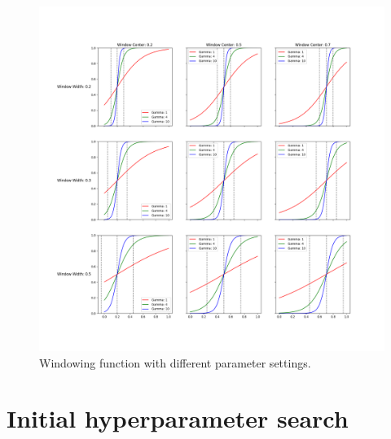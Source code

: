 \documentclass[nomenclature, english, bibtex]{kththesis}
\numberwithin{listing}{chapter}
\begin{document}
\begin{figure}
    \centering
    \includegraphics[width=1.0\textwidth]{figures/window_params.png}
    \caption{Windowing function with different parameter settings.}
    \label{fig:windowingParams}
\end{figure}



\chapter{Initial hyperparameter search}
\label{sec:initialHyperparameterSearch}
\end{document}
